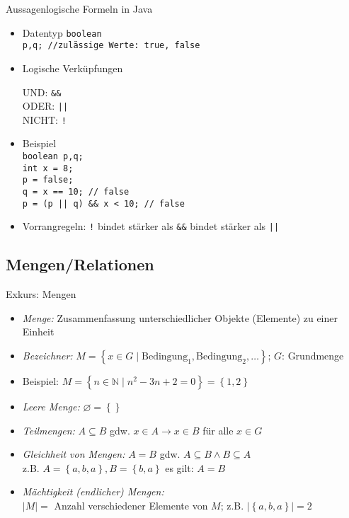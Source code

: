 \begin{frame}{Aussagenlogische Formeln in Java}
	\begin{itemize}
		\item Datentyp \texttt{boolean}\\
		\texttt{p,q; //zulässige Werte: true, false}
		\item Logische Verküpfungen\\
		\begin{tabbing}
			UND: \quad \= \texttt{\&\&}\\
			ODER: \> \texttt{||}\\
			NICHT: \> \texttt{!}
		\end{tabbing}
		\item Beispiel \\
			\texttt{boolean p,q;}\\
			\texttt{int x = 8;}\\
			\texttt{p = false;}\\
			\texttt{q = x == 10; // false}\\
			\texttt{p = (p || q) \&\& x < 10; //  false}
		\item Vorrangregeln: \texttt{!} bindet stärker als \texttt{\&\&} bindet stärker als \texttt{||}
	\end{itemize}
\end{frame}

\subsection{Mengen/Relationen}

\begin{frame}{Exkurs: Mengen}
	\begin{itemize}
		\item \emph{Menge:} Zusammenfassung unterschiedlicher Objekte (Elemente) zu einer Einheit
		\item \emph{Bezeichner:} $M=\left\{x \in G \mid \textrm{Bedingung}_1, \textrm{Bedingung}_2, \ldots \right\}$; $G$: Grundmenge
		\item Beispiel: $M=\left\{n \in \mathbb{N} \mid n^2-3n+2=0 \right\}=\left\{1,2\right\}$
		\item \emph{Leere Menge:} $\varnothing=\left\{{}\right\}$
		\item \emph{Teilmengen:} $A \subseteq B$ gdw. $x \in A \rightarrow x \in B$ für alle $x \in G$
		\item \emph{Gleichheit von Mengen:} $A=B$ gdw. $A \subseteq B \land B \subseteq A$\\
			z.B. $A = \left\{a, b, a\right\}, B = \left\{b, a\right\}$ es gilt: $A = B$
		\item \emph{Mächtigkeit (endlicher) Mengen:}\\
		$|M|=$ Anzahl verschiedener Elemente von $M$; z.B. $|\left\{a, b, a\right\}|=2$
	\end{itemize}
\end{frame}

